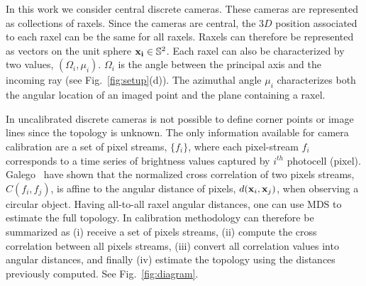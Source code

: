 In this work we consider central discrete cameras. These cameras are represented as collections of raxels. Since the cameras are central, the $3D$ position associated to each raxel can be the same for all raxels. Raxels can therefore be represented as vectors on the unit sphere $\mathbf{x_i}\in\mathbb{S}^{2}$.
%
%
%
Each raxel can also be characterized by two values, $(\Omega_i, \mu_i)$.
$\Omega_i$ is the angle between the principal axis and the incoming ray (see Fig.~\ref{fig:setup}(d)).
%
The azimuthal angle $\mu_i$ characterizes both the angular location of an imaged point and the plane containing a raxel.


In uncalibrated discrete cameras is not possible to define corner points or image lines since the topology is unknown. The only information available for camera calibration
are a set of pixel streams, $\{ f_i \}$, where each pixel-stream $f_i$ corresponds to a time series of brightness values captured by $i^{th}$ photocell (pixel).
%
Galego~\etal\cite{Galego13} have shown that the normalized cross correlation of two pixels streams, $C(f_i, f_j)$, is affine to the angular distance of pixels, $d(\mathbf{x}_i,\mathbf{x}_j)$, when observing a circular object.
%
Having all-to-all raxel angular distances, one can use %
MDS to estimate the full topology. 
%
In calibration methodology can therefore be summarized as
%
(i) receive a set of pixels streams,
(ii) compute the cross correlation between all pixels streams,
(iii) convert all correlation values into angular distances, and finally
(iv) estimate the topology using the distances previously computed.
%
See Fig.~\ref{fig:diagram}.




